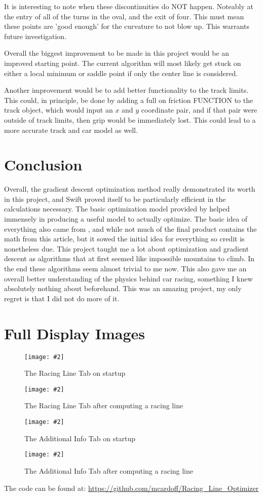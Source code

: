 \documentclass[12pt,twocolumn]{article}
\newcommand{\fig}[3]
{
  \begin{figure}[H]
    \centering
    \texttt{[image: \#2]}
    \caption{#3}
  \end{figure}
}
\begin{document}
It is interesting to note when these discontinuities do NOT happen. Noteably at the entry of all of the turns in the oval, and the exit of four. This must mean these points are 'good enough' for the curvature to not blow up. This warrants future investigation.

Overall the biggest improvement to be made in this project would be an improved starting point. The current algorithm will most likely get stuck on either a local minimum or saddle point if only the center line is considered.

Another improvement would be to add better functionality to the track limits. This could, in principle, be done by adding a full on friction FUNCTION to the track object, which would input an $x$ and $y$ coordinate pair, and if that pair were outside of track limits, then grip would be immediately lost. This could lead to a more accurate track and car model as well.
\newpage
\section{Conclusion}
Overall, the gradient descent optimization method really demonstrated its worth in this project, and Swift proved itself to be particularly efficient in the calculations necessary. The basic optimization model provided by \cite{mit} helped immensely in producing a useful model to actually optimize. The basic idea of everything also came from \cite{phors}, and while not much of the final product contains the math from this article, but it sowed the initial idea for everything so credit is nonetheless due. This project taught me a lot about optimization and gradient descent as algorithms that at first seemed like impossible mountains to climb. In the end these algorithms seem almost trivial to me now. This also gave me an overall better understanding of the physics behind car racing, something I knew absolutely nothing about beforehand. This was an amazing project, my only regret is that I did not do more of it.
\vfill
\appendix
\section{Full Display Images}
\fig{8.0}{UI4}{The Racing Line Tab on startup}
\fig{8.0}{UI1}{The Racing Line Tab after computing a racing line}
\fig{8.0}{UI3}{The Additional Info Tab on startup}
\fig{8.0}{UI2}{The Additional Info Tab after computing a racing line}
The code can be found at: \url{https://github.com/mcardoff/Racing_Line_Optimizer}
\newpage


\end{document}
